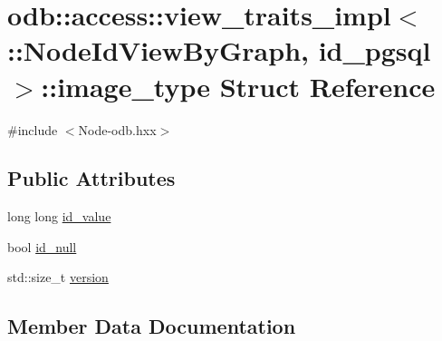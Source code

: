 \hypertarget{structodb_1_1access_1_1view__traits__impl_3_01_1_1_node_id_view_by_graph_00_01id__pgsql_01_4_1_1image__type}{}\section{odb\+:\+:access\+:\+:view\+\_\+traits\+\_\+impl$<$ \+:\+:Node\+Id\+View\+By\+Graph, id\+\_\+pgsql $>$\+:\+:image\+\_\+type Struct Reference}
\label{structodb_1_1access_1_1view__traits__impl_3_01_1_1_node_id_view_by_graph_00_01id__pgsql_01_4_1_1image__type}


{\ttfamily \#include $<$Node-\/odb.\+hxx$>$}

\subsection*{Public Attributes}
\begin{DoxyCompactItemize}
\item 
long long \hyperlink{structodb_1_1access_1_1view__traits__impl_3_01_1_1_node_id_view_by_graph_00_01id__pgsql_01_4_1_1image__type_ad1f0b261aa9fc3e6d395050313e89df4}{id\+\_\+value}
\item 
bool \hyperlink{structodb_1_1access_1_1view__traits__impl_3_01_1_1_node_id_view_by_graph_00_01id__pgsql_01_4_1_1image__type_a908a69b5f62c62425c9ae468e9fc1707}{id\+\_\+null}
\item 
std\+::size\+\_\+t \hyperlink{structodb_1_1access_1_1view__traits__impl_3_01_1_1_node_id_view_by_graph_00_01id__pgsql_01_4_1_1image__type_afa27e8f02e6d69738e02c54d17a2c3f8}{version}
\end{DoxyCompactItemize}


\subsection{Member Data Documentation}
\hypertarget{structodb_1_1access_1_1view__traits__impl_3_01_1_1_node_id_view_by_graph_00_01id__pgsql_01_4_1_1image__type_a908a69b5f62c62425c9ae468e9fc1707}{}
